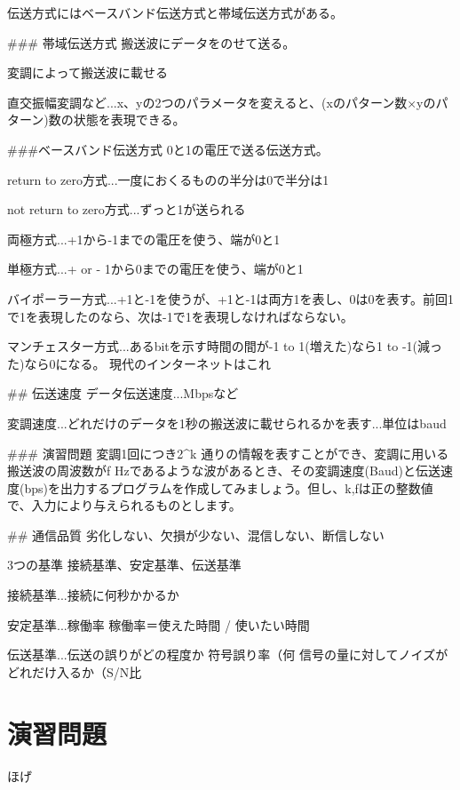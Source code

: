 伝送方式にはベースバンド伝送方式と帯域伝送方式がある。

### 帯域伝送方式
搬送波にデータをのせて送る。

変調によって搬送波に載せる

直交振幅変調など...x、yの2つのパラメータを変えると、(xのパターン数×yのパターン)数の状態を表現できる。

###ベースバンド伝送方式
0と1の電圧で送る伝送方式。

return to zero方式...一度におくるものの半分は0で半分は1

not return to zero方式...ずっと1が送られる

両極方式...+1から-1までの電圧を使う、端が0と1

単極方式...+ or - 1から0までの電圧を使う、端が0と1

バイポーラー方式...+1と-1を使うが、+1と-1は両方1を表し、0は0を表す。前回1で1を表現したのなら、次は-1で1を表現しなければならない。

マンチェスター方式...あるbitを示す時間の間が-1 to 1(増えた)なら1 to -1(減った)なら0になる。
現代のインターネットはこれ


## 伝送速度
データ伝送速度...Mbpsなど

変調速度...どれだけのデータを1秒の搬送波に載せられるかを表す...単位はbaud

### 演習問題
変調1回につき2^k 通りの情報を表すことができ、変調に用いる搬送波の周波数がf Hzであるような波があるとき、その変調速度(Baud)と伝送速度(bps)を出力するプログラムを作成してみましょう。但し、k,fは正の整数値で、入力により与えられるものとします。

## 通信品質
劣化しない、欠損が少ない、混信しない、断信しない

3つの基準
接続基準、安定基準、伝送基準

接続基準...接続に何秒かかるか

安定基準...稼働率
稼働率＝使えた時間 / 使いたい時間

伝送基準...伝送の誤りがどの程度か
符号誤り率（何%
信号の量に対してノイズがどれだけ入るか（S/N比

\section{}

\section*{演習問題}
\begin{problems}
\item ほげ
\end{problems}
